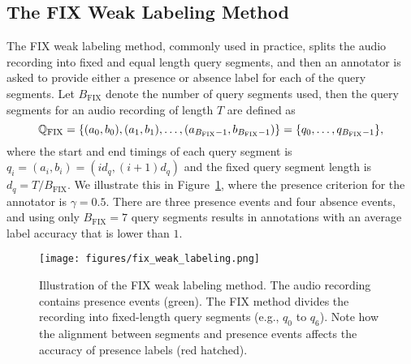 \subsection{The FIX Weak Labeling Method}
\label{sec:fix_weak_labeling_method}
The FIX weak labeling method, commonly used in practice, splits the audio recording into fixed and equal length query segments, and then an annotator is asked to provide either a presence or absence label for each of the query segments. 
Let $B_{\text{FIX}}$ denote the number of query segments used, then the query segments for an audio recording of length $T$ are defined as
\begin{equation}
\label{eq:fix}
    {\mathbb{Q}}_{\text{FIX}} = \{(a_0, b_0), (a_1, b_1), \dots, (a_{B_{\text{FIX}}-1}, b_{B_{\text{FIX}}-1})\} = \{q_0, \dots, q_{B_{\text{FIX}}-1}\},
\end{equation}
where the start and end timings of each query segment is $q_i = (a_i, b_i) = (id_q, (i+1)d_q)$ and the fixed query segment length is $d_q = T / B_{\text{FIX}} $. We illustrate this in Figure~\ref{fig:fix_weak_labeling}, where the presence criterion for the annotator is $\gamma=0.5$. There are three presence events and four absence events, and using only $B_{\text{FIX}}=7$ query segments results in annotations with an average label accuracy that is lower than $1$. 

\begin{figure}[ht!]
    \centering
    \texttt{[image: figures/fix\_weak\_labeling.png]}
    \caption{
    Illustration of the FIX weak labeling method. The audio recording contains presence events (green). The FIX method divides the recording into fixed-length query segments (e.g., $q_0$ to $q_6$). Note how the alignment between segments and presence events affects the accuracy of presence labels (red hatched).
    } 
    \label{fig:fix_weak_labeling}
\end{figure}

